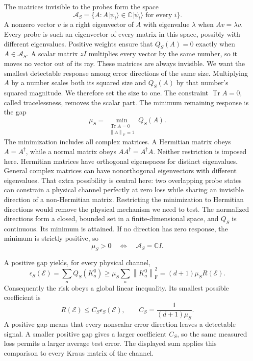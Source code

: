 \documentclass[11pt,a4paper]{article}
\newcommand{\ket}[1]{\lvert #1\rangle}
\newcommand{\Tr}{\operatorname{Tr}}
\newcommand{\normF}[1]{\left\lVert #1\right\rVert_{\mathrm F}}
\numberwithin{equation}{section}
\begin{document}
The matrices invisible to the probes form the space
\[
\mathcal A_S=\{A:A\ket{\psi_i}\in\mathbb C\ket{\psi_i}
                    \text{ for every }i\}.
\]
A nonzero vector $v$ is a right eigenvector of $A$ with eigenvalue $\lambda$ when $Av=\lambda v$. Every probe is such an eigenvector of every matrix in this space, possibly with different eigenvalues. Positive weights ensure that $Q_S(A)=0$ exactly when $A\in\mathcal A_S$. A scalar matrix $zI$ multiplies every vector by the same number, so it
moves no vector out of its ray. These matrices are always invisible.
We want the smallest detectable response among error directions of the
same size. Multiplying $A$ by a number scales both its squared size and
$Q_S(A)$ by that number's squared magnitude. We therefore set the size
to one. The constraint $\Tr A=0$, called tracelessness, removes the scalar
part. The minimum remaining response is the gap
\[
\mu_S=\min_{\substack{\Tr A=0\\\normF{A}=1}}Q_S(A).
\]
The minimization includes all complex matrices. A Hermitian matrix obeys $A=A^\dagger$, while a normal matrix obeys $AA^\dagger=A^\dagger A$. Neither restriction is imposed here. Hermitian matrices have orthogonal eigenspaces for distinct eigenvalues. General complex matrices can have nonorthogonal eigenvectors with different eigenvalues. That extra possibility is central here: two overlapping probe states can constrain a physical channel perfectly at zero loss while sharing an invisible direction of a non-Hermitian matrix. Restricting the minimization to Hermitian directions would remove the physical mechanism we need to test. The normalized directions form a closed, bounded set in a finite-dimensional space, and $Q_S$ is continuous. Its minimum is attained. If no direction has zero response, the minimum is strictly positive, so
\[
\mu_S>0\quad\Longleftrightarrow\quad\mathcal A_S=\mathbb CI.
\]

A positive gap yields, for every physical channel,
\[
\epsilon_S(\mathcal E)
=\sum_aQ_S(K_a^0)
\geq\mu_S\sum_a\normF{K_a^0}^2
=(d+1)\mu_SR(\mathcal E).
\]
Consequently the risk obeys a global linear inequality. Its smallest possible coefficient is
\[
\boxed{R(\mathcal E)\leq C_S\epsilon_S(\mathcal E),\qquad
C_S=\frac{1}{(d+1)\mu_S}.}
\]
A positive gap means that every nonscalar error direction leaves a detectable signal. A smaller positive gap gives a larger coefficient $C_S$, so the same measured loss permits a larger average test error. The displayed sum applies this comparison to every Kraus matrix of the channel.
\end{document}
